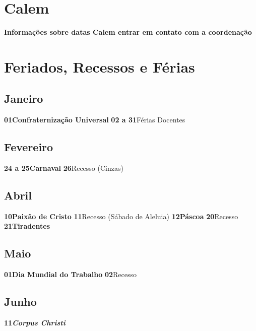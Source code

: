 \documentclass[thesis]{hmcposter}
\begin{document}
\begin{poster}
\newpage\section{\color{hmcorange}Calem}\textbf{Informações sobre datas Calem entrar em contato com a coordenação} \newpage\onespacing \section{\color{hmcorange}Feriados, Recessos e Férias}\subsection{Janeiro}\textbf{01}\quad \quad \quad \quad \textbf{Confraternização Universal} \newline\textbf{02 a 31}\quad \quad Férias Docentes \newline\subsection{Fevereiro}\textbf{24 a 25}\quad \quad \textbf{Carnaval} \newline\textbf{26}\quad \quad \quad \quad Recesso (Cinzas) \newline\subsection{Abril}\textbf{10}\quad \quad \quad \quad \textbf{Paixão de Cristo} \newline\textbf{11}\quad \quad \quad \quad Recesso (Sábado de Aleluia) \newline\textbf{12}\quad \quad \quad \quad \textbf{Páscoa} \newline\textbf{20}\quad \quad \quad \quad Recesso \newline\textbf{21}\quad \quad \quad \quad \textbf{Tiradentes} \newline\subsection{Maio}\textbf{01}\quad \quad \quad \quad \textbf{Dia Mundial do Trabalho} \newline\textbf{02}\quad \quad \quad \quad Recesso \newline\subsection{Junho}\textbf{11}\quad \quad \quad \quad \textbf{\textit{Corpus Christi}} 
\end{poster}
\end{document}
